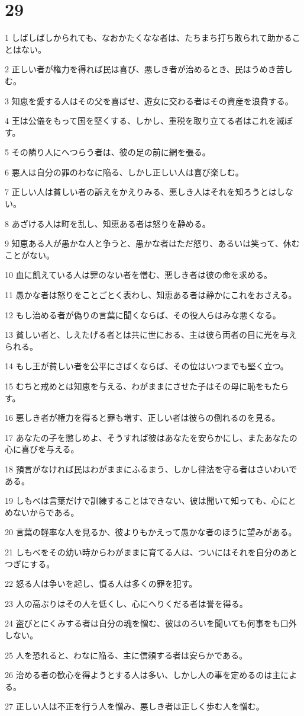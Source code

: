 \chapter{29}

\par 1 しばしばしかられても、なおかたくなな者は、たちまち打ち敗られて助かることはない。
\par 2 正しい者が権力を得れば民は喜び、悪しき者が治めるとき、民はうめき苦しむ。
\par 3 知恵を愛する人はその父を喜ばせ、遊女に交わる者はその資産を浪費する。
\par 4 王は公儀をもって国を堅くする、しかし、重税を取り立てる者はこれを滅ぼす。
\par 5 その隣り人にへつらう者は、彼の足の前に網を張る。
\par 6 悪人は自分の罪のわなに陥る、しかし正しい人は喜び楽しむ。
\par 7 正しい人は貧しい者の訴えをかえりみる、悪しき人はそれを知ろうとはしない。
\par 8 あざける人は町を乱し、知恵ある者は怒りを静める。
\par 9 知恵ある人が愚かな人と争うと、愚かな者はただ怒り、あるいは笑って、休むことがない。
\par 10 血に飢えている人は罪のない者を憎む、悪しき者は彼の命を求める。
\par 11 愚かな者は怒りをことごとく表わし、知恵ある者は静かにこれをおさえる。
\par 12 もし治める者が偽りの言葉に聞くならば、その役人らはみな悪くなる。
\par 13 貧しい者と、しえたげる者とは共に世におる、主は彼ら両者の目に光を与えられる。
\par 14 もし王が貧しい者を公平にさばくならば、その位はいつまでも堅く立つ。
\par 15 むちと戒めとは知恵を与える、わがままにさせた子はその母に恥をもたらす。
\par 16 悪しき者が権力を得ると罪も増す、正しい者は彼らの倒れるのを見る。
\par 17 あなたの子を懲しめよ、そうすれば彼はあなたを安らかにし、またあなたの心に喜びを与える。
\par 18 預言がなければ民はわがままにふるまう、しかし律法を守る者はさいわいである。
\par 19 しもべは言葉だけで訓練することはできない、彼は聞いて知っても、心にとめないからである。
\par 20 言葉の軽率な人を見るか、彼よりもかえって愚かな者のほうに望みがある。
\par 21 しもべをその幼い時からわがままに育てる人は、ついにはそれを自分のあとつぎにする。
\par 22 怒る人は争いを起し、憤る人は多くの罪を犯す。
\par 23 人の高ぶりはその人を低くし、心にへりくだる者は誉を得る。
\par 24 盗びとにくみする者は自分の魂を憎む、彼はのろいを聞いても何事をも口外しない。
\par 25 人を恐れると、わなに陥る、主に信頼する者は安らかである。
\par 26 治める者の歓心を得ようとする人は多い、しかし人の事を定めるのは主による。
\par 27 正しい人は不正を行う人を憎み、悪しき者は正しく歩む人を憎む。

